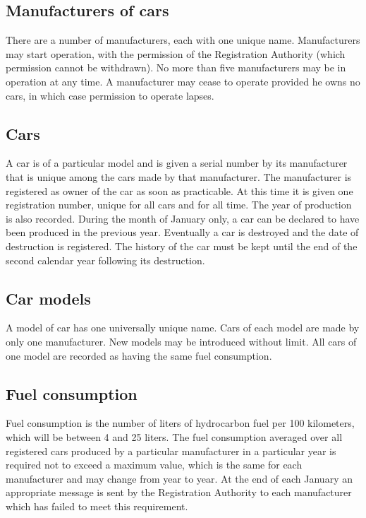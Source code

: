 \documentclass{article}
\begin{document}
\subsection{Manufacturers of cars}

There are a number of manufacturers, each with one unique name. Manufacturers
may start operation, with the permission of the Registration Authority (which
permission cannot be withdrawn). No more than five manufacturers may be in
operation at any time. A manufacturer may cease to operate provided he owns no
cars, in which case permission to operate lapses.

\subsection{Cars}

A car is of a particular model and is given a serial number by its
manufacturer that is unique among the cars made by that manufacturer. The
manufacturer is registered as owner of the car as soon as practicable. At this
time it is given one registration number, unique for all cars and for all
time. The year of production is also recorded. During the month of January
only, a car can be declared to have been produced in the previous year.
Eventually a car is destroyed and the date of destruction is registered. The
history of the car must be kept until the end of the second calendar year
following its destruction.

\subsection{Car models}

A model of car has one universally unique name. Cars of each model are made by
only one manufacturer. New models may be introduced without limit. All cars of
one model are recorded as having the same fuel consumption.

\subsection{Fuel consumption}

Fuel consumption is the number of liters of hydrocarbon fuel per 100
kilometers, which will be between 4 and 25 liters. The fuel consumption
averaged over all registered cars produced by a particular manufacturer in a
particular year is required not to exceed a maximum value, which is the same
for each manufacturer and may change from year to year. At the end of each
January an appropriate message is sent by the Registration Authority to each
manufacturer which has failed to meet this requirement.
\end{document}
